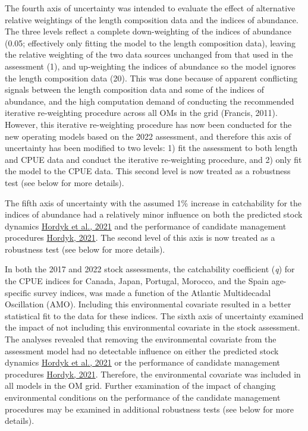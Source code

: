\documentclass[
]{article}
\begin{document}
The fourth axis of uncertainty was intended to evaluate the effect of alternative relative weightings of the length composition data and the indices of abundance. The three levels reflect a complete down-weighting of the indices of abundance (0.05; effectively only fitting the model to the length composition data), leaving the relative weighting of the two data sources unchanged from that used in the assessment (1), and up-weighting the indices of abundance so the model ignores the length composition data (20). This was done because of apparent conflicting signals between the length composition data and some of the indices of abundance, and the high computation demand of conducting the recommended iterative re-weighting procedure across all OMs in the grid (Francis, 2011). However, this iterative re-weighting procedure has now been conducted for the new operating models based on the 2022 assessment, and therefore this axis of uncertainty has been modified to two levels: 1) fit the assessment to both length and CPUE data and conduct the iterative re-weighting procedure, and 2) only fit the model to the CPUE data. This second level is now treated as a robustness test (see below for more details).

The fifth axis of uncertainty with the assumed 1\% increase in catchability for the indices of abundance had a relatively minor influence on both the predicted stock dynamics \href{https://iccat.github.io/nswo-mse/SCRS_Papers//Hordyk_et_al_SCRS_2021_099.pdf}{Hordyk et al., 2021} and the performance of candidate management procedures \href{https://iccat.github.io/nswo-mse/SCRS_Papers//Hordyk_SCRS_2021_161.pdf}{Hordyk, 2021}. The second level of this axis is now treated as a robustness test (see below for more details).

In both the 2017 and 2022 stock assessments, the catchability coefficient (\emph{q}) for the CPUE indices for Canada, Japan, Portugal, Morocco, and the Spain age-specific survey indices, was made a function of the Atlantic Multidecadal Oscillation (AMO). Including this environmental covariate resulted in a better statistical fit to the data for these indices. The sixth axis of uncertainty examined the impact of not including this environmental covariate in the stock assessment. The analyses revealed that removing the environmental covariate from the assessment model had no detectable influence on either the predicted stock dynamics \href{https://iccat.github.io/nswo-mse/SCRS_Papers//Hordyk_et_al_SCRS_2021_099.pdf}{Hordyk et al., 2021} or the performance of candidate management procedures \href{https://iccat.github.io/nswo-mse/SCRS_Papers//Hordyk_SCRS_2021_161.pdf}{Hordyk, 2021}. Therefore, the environmental covariate was included in all models in the OM grid. Further examination of the impact of changing environmental conditions on the performance of the candidate management procedures may be examined in additional robustness tests (see below for more details).
\end{document}
